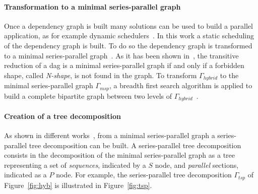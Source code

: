 \paragraph{Transformation to a minimal series-parallel graph} Once a dependency graph is built many solutions can be used to build a parallel application, as for example dynamic schedulers~\cite{Augonnet2011,Gautier:2013:XRS:2510661.2511383}. In this work a static scheduling of the dependency graph is built. To do so the dependency graph is transformed to a minimal series-parallel graph~\cite{Valdes:1979:RSP:800135.804393}. As it has been shown in~\cite{Valdes:1979:RSP:800135.804393}, the transitive reduction of a dag is a minimal series-parallel graph if and only if a forbidden shape, called \emph{N-shape}, is not found in the graph. To transform $\Gamma_{hybrid}$ to the minimal series-parallel graph $\Gamma_{msp}$, a breadth first search algorithm is applied to build a complete bipartite graph between two levels of $\Gamma_{hybrid}$~\cite{Mitchell:2004:CMV:1082101.1082117}.

\paragraph{Creation of a tree decomposition} As shown in different works~\cite{Valdes:1979:RSP:800135.804393,Schoenmakers95anew}, from a minimal series-parallel graph a series-parallel tree decomposition can be built. A series-parallel tree decomposition consists in the decomposition of the minimal series-parallel graph as a tree representing a set of \emph{sequences}, indicated by a $S$ node, and \emph{parallel} sections, indicated as a $P$ node. For example, the series-parallel tree decomposition $\Gamma_{tsp}$ of Figure~\ref{fig:hyb} is illustrated in Figure~\ref{fig:tsp}.

